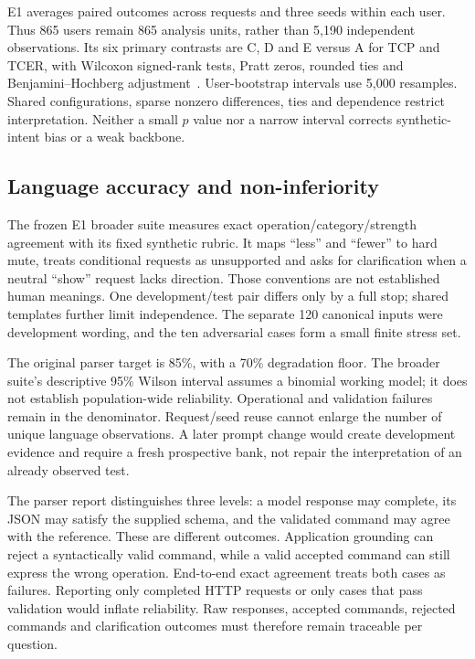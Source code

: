 \documentclass[conference]{IEEEtran}
\begin{document}
E1 averages paired outcomes across requests and three seeds within each user. Thus 865 users remain 865 analysis units, rather than 5,190 independent observations. Its six primary contrasts are C, D and E versus A for TCP and TCER, with Wilcoxon signed-rank tests, Pratt zeros, rounded ties and Benjamini--Hochberg adjustment~\cite{scipywilcoxon,scipyfdr}. User-bootstrap intervals use 5,000 resamples. Shared configurations, sparse nonzero differences, ties and dependence restrict interpretation. Neither a small $p$ value nor a narrow interval corrects synthetic-intent bias or a weak backbone.

\subsection{Language accuracy and non-inferiority}
The frozen E1 broader suite measures exact operation/category/strength agreement with its fixed synthetic rubric. It maps ``less'' and ``fewer'' to hard mute, treats conditional requests as unsupported and asks for clarification when a neutral ``show'' request lacks direction. Those conventions are not established human meanings. One development/test pair differs only by a full stop; shared templates further limit independence. The separate 120 canonical inputs were development wording, and the ten adversarial cases form a small finite stress set.

The original parser target is 85\%, with a 70\% degradation floor. The broader suite's descriptive 95\% Wilson interval assumes a binomial working model; it does not establish population-wide reliability. Operational and validation failures remain in the denominator. Request/seed reuse cannot enlarge the number of unique language observations. A later prompt change would create development evidence and require a fresh prospective bank, not repair the interpretation of an already observed test.

The parser report distinguishes three levels: a model response may complete, its JSON may satisfy the supplied schema, and the validated command may agree with the reference. These are different outcomes. Application grounding can reject a syntactically valid command, while a valid accepted command can still express the wrong operation. End-to-end exact agreement treats both cases as failures. Reporting only completed HTTP requests or only cases that pass validation would inflate reliability. Raw responses, accepted commands, rejected commands and clarification outcomes must therefore remain traceable per question.
\end{document}
